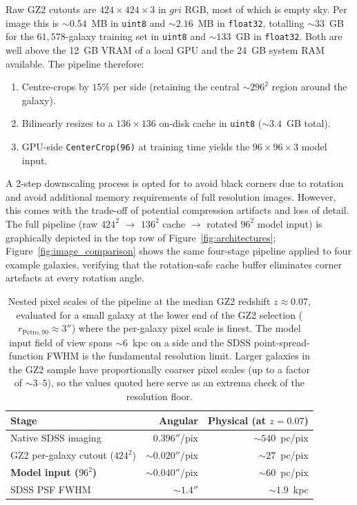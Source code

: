 \documentclass[10pt,preprint2]{aastex}
\begin{document}
Raw GZ2 cutouts are $424 \times 424 \times 3$ in $gri$ RGB, most of which is empty sky. Per image this is $\sim 0.54$~MB in \texttt{uint8} and $\sim 2.16$~MB in \texttt{float32}, totalling $\sim 33$~GB for the $61{,}578$-galaxy training set in \texttt{uint8} and $\sim 133$~GB in \texttt{float32}. Both are well above the 12~GB VRAM of a local GPU and the 24~GB system RAM available. The pipeline therefore:
\begin{enumerate}
  \item Centre-crops by $15\%$ per side (retaining the central $\sim 296^2$ region around the galaxy).
  \item Bilinearly resizes to a $136 \times 136$ on-disk cache in \texttt{uint8} ($\sim 3.4$~GB total).
  \item GPU-side \texttt{CenterCrop(96)} at training time yields the $96 \times 96 \times 3$ model input.
\end{enumerate}

A 2-step downscaling process is opted for to avoid black corners due to rotation and avoid additional memory requirements of full resolution images. However, this comes with the trade-off of potential compression artifacts and loss of detail. The full pipeline (raw $424^2$ $\rightarrow$ $136^2$ cache $\rightarrow$ rotated $96^2$ model input) is graphically depicted in the top row of Figure~\ref{fig:architectures}; Figure~\ref{fig:image_comparison} shows the same four-stage pipeline applied to four example galaxies, verifying that the rotation-safe cache buffer eliminates corner artefacts at every rotation angle.

\begin{table}[t!]
  \centering
  \small
  \begin{tabular}{lrr}
    \toprule
    Stage & Angular & Physical (at $z = 0.07$) \\
    \midrule
    Native SDSS imaging                 & $0.396''$/pix      & $\sim 540$~pc/pix \\
    GZ2 per-galaxy cutout ($424^2$)     & $\sim 0.020''$/pix & $\sim 27$~pc/pix  \\
    \textbf{Model input ($96^2$)}        & $\sim 0.040''$/pix & $\sim 60$~pc/pix  \\
    SDSS PSF FWHM                       & $\sim 1.4''$       & $\sim 1.9$~kpc    \\
    \bottomrule
  \end{tabular}
  \caption{Nested pixel scales of the pipeline at the median GZ2 redshift $z \approx 0.07$, evaluated for a small galaxy at the lower end of the GZ2 selection ($r_{\mathrm{Petro,90}} \approx 3''$) where the per-galaxy pixel scale is finest. The model input field of view spans $\sim 6$~kpc on a side and the SDSS point-spread-function FWHM is the fundamental resolution limit. Larger galaxies in the GZ2 sample have proportionally coarser pixel scales (up to a factor of $\sim 3$--$5$), so the values quoted here serve as an extrema check of the resolution floor.}
  \label{tab:scales}
\end{table}
\end{document}

